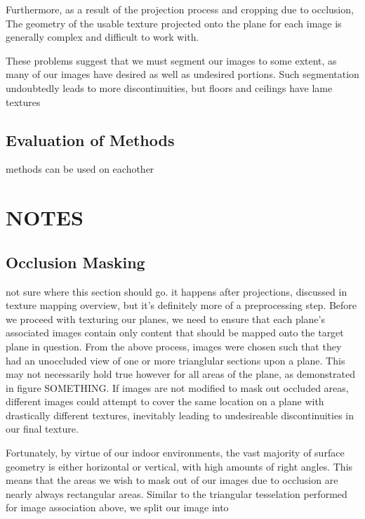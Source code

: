 \documentclass[10pt,twocolumn,letterpaper]{article}
\begin{document}
Furthermore, as a result of the projection process and cropping due to occlusion, The geometry of the usable texture projected onto the plane for each image is generally complex and difficult to work with.

These problems suggest that we must segment our images to some extent, as many of our images have desired as well as undesired portions. Such segmentation undoubtedly leads to more discontinuities, but floors and ceilings have lame textures


\subsection{Evaluation of Methods}
methods can be used on eachother







\section{NOTES}

\subsection{Occlusion Masking}
not sure where this section should go. it happens after projections,
discussed in texture mapping overview, but it's definitely more of a
preprocessing step.  Before we proceed with texturing our planes, we
need to ensure that each plane's associated images contain only
content that should be mapped onto the target plane in question. From
the above process, images were chosen such that they had an unoccluded
view of one or more trianglular sections upon a plane. This may not
necessarily hold true however for all areas of the plane, as
demonstrated in figure SOMETHING. If images are not modified to mask
out occluded areas, different images could attempt to cover the same
location on a plane with drastically different textures, inevitably
leading to undesireable discontinuities in our final texture.

Fortunately, by virtue of our indoor environments, the vast majority
of surface geometry is either horizontal or vertical, with high
amounts of right angles. This means that the areas we wish to mask out
of our images due to occlusion are nearly always rectangular
areas. Similar to the triangular tesselation performed for image
association above, we split our image into
\end{document}
